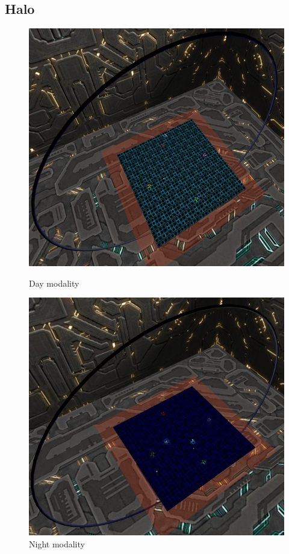\documentclass[11pt]{article}
\begin{document}
\FloatBarrier



\subsection{Halo}

\begin{figure}
	\centering
	\begin{minipage}[b]{0.45\linewidth}
		\includegraphics[width=\linewidth]{giorno}
		\caption{Day modality}
	\end{minipage}
	\hfill
	\begin{minipage}[b]{0.45\linewidth}
		\includegraphics[width=\linewidth]{notte}
		\caption{Night modality}
	\end{minipage}
\end{figure}
\end{document}
